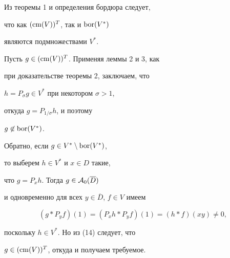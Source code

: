 \begin{pf}


Из теоремы 1 и определения бордюра следует,


что как $(\operatorname{cm} (V))^T$, так и $\operatorname{bor} (V^* )$ 


являются подмножествами $V^*$. 


Пусть $g \in (\operatorname{cm} (V))^T$. Применяя леммы 2 и 3, как 


при доказательстве теоремы 2, заключаем, что 


$h= P_{\sigma} g \in V^*$ при некотором $\sigma >1$,


откуда $g = P_{1/\sigma} h$, и поэтому 


$g \not\in \operatorname{bor} (V^*)$. 





Обратно, если $g \in V^* \setminus \operatorname{bor} (V^* )$, 


то выберем $ h\in V^*$ и $x\in D$ такие,


что $g=P_x h$. Тогда $g\in {\cal A}_0 (\overline{D})$ 


и одновременно для всех $y\in \overline{D}$, $f\in V$ имеем


\begin{equation}


(g*P_y f)(1) = (P_x h*P_y f)(1) = (h*f)(xy) \neq 0, 


\end{equation}


поскольку $h\in V^*$. Но из (14) следует, что 


$g \in (\operatorname{cm} (V))^T$, откуда и получаем требуемое.


\end{pf}





